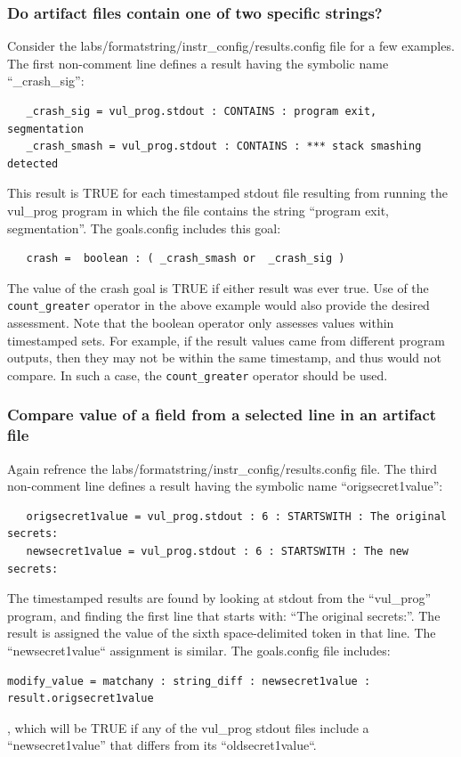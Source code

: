 \documentclass[12pt]{article}
\begin{document}
\subsubsection{Do artifact files contain one of two specific strings?}
Consider the labs/formatstring/instr\_config/results.config file for a few examples.  
The first non-comment line defines a result having the symbolic name ``\_crash\_sig'':
\begin{verbatim}
   _crash_sig = vul_prog.stdout : CONTAINS : program exit, segmentation
   _crash_smash = vul_prog.stdout : CONTAINS : *** stack smashing detected
\end{verbatim}
\noindent This result is TRUE for each timestamped stdout file resulting from running 
the vul\_prog program in which the file contains the string ``program exit, segmentation''.
The goals.config includes this goal:
\begin{verbatim}
   crash =  boolean : ( _crash_smash or  _crash_sig )
\end{verbatim}
\noindent The value of the crash goal is TRUE if either result was ever true.
Use of the {\tt count\_greater} operator in the above example would also provide
the desired assessment.  Note that the boolean operator only assesses values within
timestamped sets. For example, if the result values came from different program
outputs, then they may not be within the same timestamp, and thus would not compare.
In such a case, the {\tt count\_greater} operator should be used. 

\subsubsection{Compare value of a field from a selected line in an artifact file}
Again refrence the labs/formatstring/instr\_config/results.config file.  The third non-comment line
defines a result having the symbolic name ``origsecret1value'':  
\begin{verbatim}
   origsecret1value = vul_prog.stdout : 6 : STARTSWITH : The original secrets:
   newsecret1value = vul_prog.stdout : 6 : STARTSWITH : The new secrets:
\end{verbatim}
\noindent The timestamped results are
found by looking at stdout from the ``vul\_prog'' program, and finding the first line that starts with:
``The original secrets:''.  The result is assigned the value of the sixth space-delimited 
token in that line.  The ``newsecret1value`` assignment is similar.  The goals.config file includes:
\begin{verbatim}
modify_value = matchany : string_diff : newsecret1value : result.origsecret1value
\end{verbatim}
\noindent , which will be TRUE if any of the vul\_prog stdout files include a
``newsecret1value'' that differs from its ``oldsecret1value``.
\end{document}
